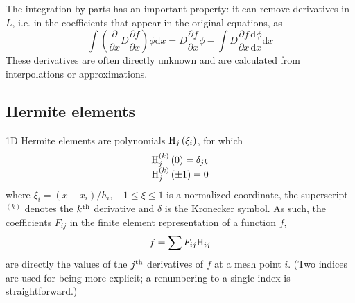 The integration by parts has an important property: it can
remove derivatives in $L$, i.e. in the coefficients that appear
in the original equations, as
\begin{equation}
\int {\left( {\frac{\partial }{{\partial x}}D\frac{{\partial f}}{{\partial x}}} \right)\phi {\text{d}}x}  = D\frac{{\partial f}}{{\partial x}}\phi  - \int {D\frac{{\partial f}}{{\partial x}}\frac{{{\text{d}}\phi }}{{{\text{d}}x}}{\text{d}}x} 
\end{equation}
These derivatives are often 
directly unknown and are calculated from interpolations or
approximations.

\subsection{Hermite elements} %
\label{ssub:hermite_elements}
1D Hermite elements are polynomials ${\rm H}_{j}\left(\xi_i\right)$,
for which
\begin{equation}
\begin{array}{*{20}{c}}
  {{\rm H} _{j}^{\left( k \right)}\left( 0 \right) = {\delta _{jk}}} \\ 
  {{\rm H} _{j}^{\left( k \right)}\left( { \pm 1} \right) = 0} 
\end{array}
\end{equation}
where $\xi_i=\left( x - x_i \right) / h_i$, $- 1 \leqslant \xi  \leqslant 1$ is a normalized coordinate,
the superscript $^{\left( k \right)}$ denotes the $k^{\rm th}$
derivative and $\delta$ is the Kronecker symbol.
As such, the coefficients $F_{ij}$ in the finite element representation of
a function $f$,
\begin{equation}
f = \sum {{F_{ij}}{{\rm H} _{ij}}} 
\end{equation}
are directly the values of the $j^{\rm th}$
derivatives of $f$ at a mesh point $i$.
(Two indices are used for being more explicit; a renumbering
to a single index is straightforward.)

